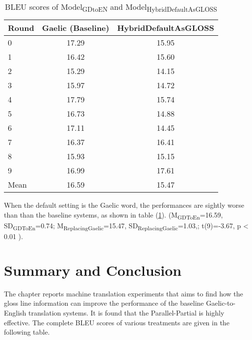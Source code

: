 \documentclass[final]{ua-thesis}
\numberwithin{equation}{section}
\begin{document}
\begin{table}[ht]
\centering
\begin{tabular}{lcc}
  \hline
Round & Gaelic (Baseline) & HybridDefaultAsGLOSS \\ 
  \hline
0 & 17.29 & 15.95 \\ 
  1 & 16.42 & 15.60 \\ 
  2 & 15.29 & 14.15 \\ 
  3 & 15.97 & 14.72 \\ 
  4 & 17.79 & 15.74 \\ 
  5 & 16.73 & 14.88 \\ 
  6 & 17.11 & 14.45 \\ 
  7 & 16.37 & 16.41 \\ 
  8 & 15.93 & 15.15 \\ 
  9 & 16.99 & 17.61 \\ 
   \hline
Mean & 16.59 & 15.47 \\ 
   \hline
\end{tabular}
\caption{BLEU scores of Model\textsubscript{GDtoEN} and Model\textsubscript{HybridDefaultAsGLOSS}} 
\label{Table:HybridDefaultAsGLOSS}
\end{table}When the default setting is the Gaelic word, the performances are sightly worse than than the baseline systems, as shown in table (\ref{Table:HybridDefaultAsGLOSS}).
(M\textsubscript{GDToEn}=16.59, SD\textsubscript{GDToEn}=0.74; M\textsubscript{ReplacingGaelic}=15.47, SD\textsubscript{ReplacingGaelic}=1.03,; t(9)=-3.67, p < 0.01 ).


\section{Summary and Conclusion}
The chapter reports machine translation experiments that aims to find how the gloss line information can improve the performance of the baseline Gaelic-to-English translation systems. It is found that the Parallel-Partial is highly effective. The complete BLEU scores of various treatments are given in the following table.
\end{document}
